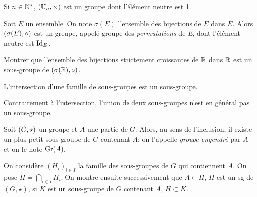 \documentclass{magnolia}
\begin{document}

\begin{proposition}
Si $n\in{\mathbb{N}^*}$, $\p{\U[n],\times}$ est un groupe dont l'élément neutre est 1.
\end{proposition}

\begin{proposition}
Soit $E$ un ensemble. On note $\sigma(E)$ l'ensemble des bijections de $E$
dans $E$. Alors $\left(\sigma(E),\circ\right)$ est un groupe, appelé groupe des
\emph{permutations} de $E$, dont l'élément neutre est $\operatorname{Id}_E$.
\end{proposition}

\begin{exoUnique}
\exo Montrer que l'ensemble des bijections strictement croissantes de $\mathbb{R}$ dans $\mathbb{R}$ est
  un sous-groupe de $(\sigma(\mathbb{R}),\circ)$.
\end{exoUnique}

\begin{proposition}
L'intersection d'une famille de sous-groupes est un sous-groupe.
\end{proposition}

\begin{remarqueUnique}
\remarque Contrairement à l'intersection, l'union de deux sous-groupes n'est
  en général pas un sous-groupe.
\end{remarqueUnique}


\begin{definition}
Soit $\left(G,\star\right)$ un groupe et $A$ une partie de $G$. Alors, au sens de l'inclusion, il existe un plus
petit sous-groupe de $G$ contenant $A$; on l'appelle \emph{groupe engendré} par $A$ et
on le note ${\rm Gr}(A)$.
\end{definition}

\begin{preuve}
On considère $(H_i)_{i\in I}$ la famille des sous-groupes de $G$ qui contiennent $A$. On pose $\displaystyle H=\bigcap_{i\in I} H_i$. On montre ensuite successivement que $A\subset H$, $H$ est un sg de $(G,\star)$, si $K$ est un sous-groupe de $G$ contenant $A$, $H\subset K$.
\end{preuve}
\end{document}
